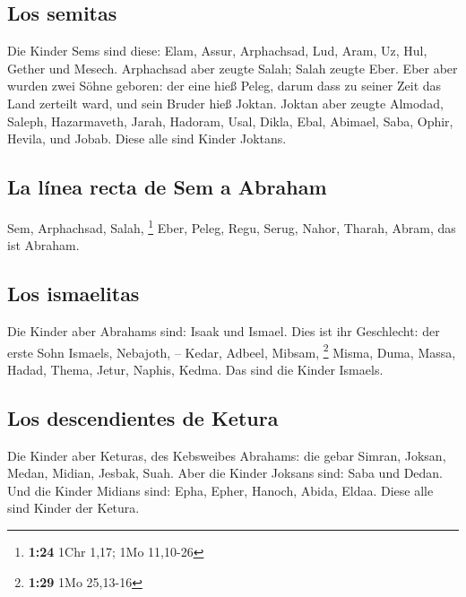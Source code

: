 \hypertarget{los-semitas}{%
\subsection{Los semitas}\label{los-semitas}}

 Die Kinder Sems sind diese: Elam, Assur, Arphachsad,
Lud, Aram, Uz, Hul, Gether und Mesech.  Arphachsad aber
zeugte Salah; Salah zeugte Eber.  Eber aber wurden zwei
Söhne geboren: der eine hieß Peleg, darum dass zu seiner Zeit das Land
zerteilt ward, und sein Bruder hieß Joktan.  Joktan aber
zeugte Almodad, Saleph, Hazarmaveth, Jarah,  Hadoram,
Usal, Dikla,  Ebal, Abimael, Saba,  Ophir,
Hevila, und Jobab. Diese alle sind Kinder Joktans.

\hypertarget{la-luxednea-recta-de-sem-a-abraham}{%
\subsection{La línea recta de Sem a
Abraham}\label{la-luxednea-recta-de-sem-a-abraham}}

 Sem, Arphachsad, Salah, \footnote{\textbf{1:24} 1Chr
  1,17; 1Mo 11,10-26}  Eber, Peleg, Regu, 
Serug, Nahor, Tharah,  Abram, das ist Abraham.

\hypertarget{los-ismaelitas}{%
\subsection{Los ismaelitas}\label{los-ismaelitas}}

 Die Kinder aber Abrahams sind: Isaak und Ismael.
 Dies ist ihr Geschlecht: der erste Sohn Ismaels,
Nebajoth, -- Kedar, Adbeel, Mibsam, \footnote{\textbf{1:29} 1Mo 25,13-16}
 Misma, Duma, Massa, Hadad, Thema,  Jetur,
Naphis, Kedma. Das sind die Kinder Ismaels.

\hypertarget{los-descendientes-de-ketura}{%
\subsection{Los descendientes de
Ketura}\label{los-descendientes-de-ketura}}

 Die Kinder aber Keturas, des Kebsweibes Abrahams: die
gebar Simran, Joksan, Medan, Midian, Jesbak, Suah. Aber die Kinder
Joksans sind: Saba und Dedan.  Und die Kinder Midians
sind: Epha, Epher, Hanoch, Abida, Eldaa. Diese alle sind Kinder der
Ketura.

